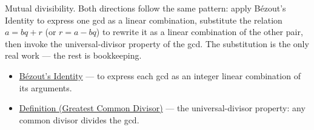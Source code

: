 \begin{remark*}
Mutual divisibility. Both directions follow the same pattern: apply
Bézout's Identity to express one gcd as a linear combination, substitute
the relation $a = bq + r$ (or $r = a - bq$) to rewrite it as a linear
combination of the other pair, then invoke the universal-divisor property
of the gcd. The substitution is the only real work — the rest is
bookkeeping.

\end{remark*}

\begin{remark*}[Dependencies]
\begin{itemize}
    \item \hyperref[thm:bezout-identity]{Bézout's Identity} — to express
          each gcd as an integer linear combination of its arguments.
    \item \hyperref[def:gcd]{Definition (Greatest Common Divisor)} —
          the universal-divisor property: any common divisor divides
          the gcd.
\end{itemize}
\end{remark*}